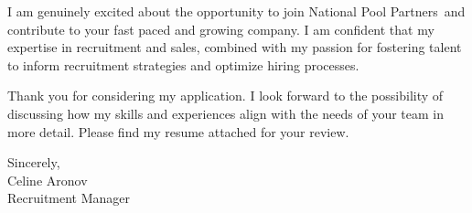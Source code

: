 \documentclass[12pt]{letter}
\def\myname{Celine Aronov}
\def\mytitle{Recruitment Manager}
\def\companyName{National Pool Partners}
\begin{document}
I am genuinely excited about the opportunity to join \companyName\, and contribute to your fast paced and growing company. I am confident that my expertise in recruitment and sales, combined with my passion for fostering talent  to inform recruitment strategies and optimize hiring processes.

Thank you for considering my application. I look forward to the possibility of discussing how my skills and experiences align with the needs of your team in more detail. Please find my resume attached for your review.



\vspace{0.1in}
\vfill

\begin{flushright}

\vspace{-0.1in}
Sincerely, \\
\myname\\


\mytitle

\end{flushright}
\end{document}
